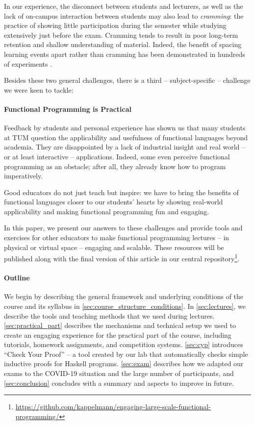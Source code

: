 In our experience, the disconnect between students and lecturers, as well as the lack of on-campus interaction between students may also lead to \emph{cramming}:
the practice of showing little participation during the semester
while studying extensively just before the exam.
Cramming tends to result in poor long-term retention and shallow understanding of material.
Indeed, the benefit of spacing learning events apart rather than cramming has been demonstrated in hundreds of experiments \cite{cramming1,cramming2}.

\vspace{\baselineskip}\noindent
Besides these two general challenges,
there is a third -- subject-specific --
challenge we were keen to tackle:

\paragraph{Functional Programming is Practical}
Feedback by students and personal experience has shown us that many students
at TUM question the applicability and usefulness
of functional languages beyond academia.
They are disappointed by a lack of industrial insight
and real world -- or at least interactive -- applications.
Indeed, some even perceive functional programming as an obstacle;
after all, they already know how to program imperatively.

Good educators do not just teach but inspire:
we have to bring the benefits of functional languages
closer to our students' hearts
by showing real-world applicability and making functional programming fun and engaging.


\vspace{\baselineskip}\noindent
In this paper,
we present our answers to these challenges
and provide tools and exercises for other educators
to make functional programming lectures -- in physical or virtual space -- engaging and scalable.
These resources will be published along with the final
version of this article in our central repository\footnote{\url{https://github.com/kappelmann/engaging-large-scale-functional-programming/}}.

\paragraph{Outline}

We begin by describing the general framework and underlying conditions of the course and its syllabus in \cref{sec:course_structure_conditions}.
In \cref{sec:lectures},
we describe the tools and teaching methods that we used during lectures.
\cref{sec:practical_part} describes the
mechanisms and technical setup
we used to create an engaging experience
for the practical part of the course,
including tutorials, homework assignments, and
competition systems.
\cref{sec:cyp} introduces
``Check Your Proof'' -- a tool created
by our lab that automatically checks simple inductive proofs for Haskell programs.
\cref{sec:exam} describes how we adapted our exams to the COVID-19 situation and the large number of participants,
and \cref{sec:conclusion} concludes with a summary and aspects to improve in future.

